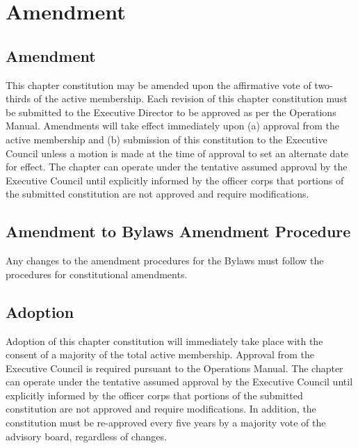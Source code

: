 \chapter{Amendment}
\section{Amendment}
This chapter constitution may be amended upon the affirmative vote of two-thirds of the active membership. Each revision of this chapter constitution must be submitted to the \hkn Executive Director to be approved as per the \hkn Operations Manual. Amendments will take effect immediately upon (a) approval from the active membership and (b) submission of this constitution to the \hkn Executive Council unless a motion is made at the time of approval to set an alternate date for effect. The chapter can operate under the tentative assumed approval by the \hkn Executive Council until explicitly informed by the officer corps that portions of the submitted constitution are not approved and require modifications.

\section{Amendment to Bylaws Amendment Procedure}
Any changes to the amendment procedures for the Bylaws must follow the procedures for constitutional amendments.

\section{Adoption}
Adoption of this chapter constitution will immediately take place with the consent of a majority of the total active membership. Approval from the \hkn Executive Council is required pursuant to the \hkn Operations Manual. The chapter can operate under the tentative assumed approval by the \hkn Executive Council until explicitly informed by the officer corps that portions of the submitted constitution are not approved and require modifications. In addition, the constitution must be re-approved every five years by a majority vote of the advisory board, regardless of changes.